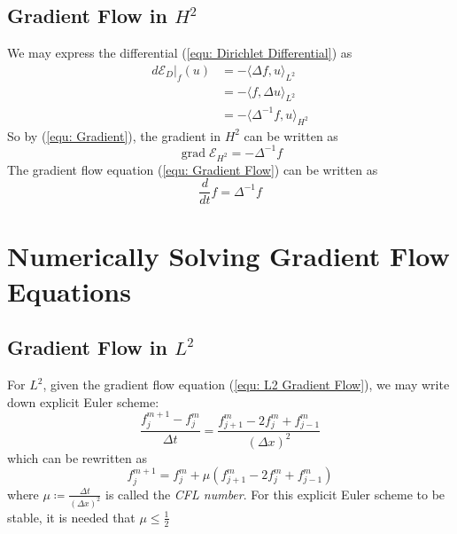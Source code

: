 \documentclass[a4paper]{article}
\theoremstyle{definition}
\DeclareMathOperator{\grad}{grad}
\begin{document}
\subsection{Gradient Flow in $H^2$}
We may express the differential (\ref{equ: Dirichlet Differential}) as
\begin{align}
    d \mathcal{E}_D|_f (u) &= - \langle \Delta f, u \rangle_{L^2} \\
    &= -\langle f, \Delta u \rangle_{L^{2}} \\
    &= -\langle \Delta^{-1} f, u \rangle_{H^2}
    \label{equ: Gradient H2 Derivation}
\end{align}
So by (\ref{equ: Gradient}), the gradient in $H^2$ can be written as
\begin{equation}
    \grad \mathcal{E}_{H^2} = - \Delta^{-1} f
    \label{equ: H2 Gradient}
\end{equation}
The gradient flow equation (\ref{equ: Gradient Flow}) can be written as
\begin{equation}
    \frac{d}{dt}f = \Delta^{-1} f
    \label{equ: H2 Gradient Flow}
\end{equation}


\section{Numerically Solving Gradient Flow Equations}
\subsection{Gradient Flow in $L^2$}
For $L^2$, given the gradient flow equation (\ref{equ: L2 Gradient Flow}),
we may write down explicit Euler scheme:
\begin{equation}
    \frac{f_j^{m+1} - f_j^m}{\Delta t} = \frac{f_{j+1}^m - 2 f_{j}^m + f_{j-1}^m}{(\Delta x)^2}
    \label{equ: L2 Numeric}
\end{equation}
which can be rewritten as
\begin{equation}
    f_{j}^{m+1} = f_j^m + \mu \left( f_{j+1}^m - 2 f_{j}^m + f_{j-1}^m \right)
\end{equation}
where $\mu \coloneqq \frac{\Delta t}{(\Delta x)^2}$ is called the \emph{CFL number}. For this explicit Euler scheme to be stable, it is needed that $\mu \leq \frac{1}{2}$
\end{document}
